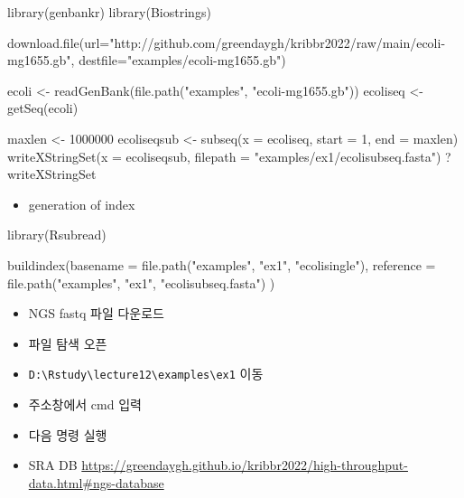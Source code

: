 \documentclass[
]{book}
\newenvironment{Shaded}{\begin{snugshade}}{\end{snugshade}}
\newcommand{\AttributeTok}[1]{\textcolor[rgb]{0.77,0.63,0.00}{#1}}
\newcommand{\DecValTok}[1]{\textcolor[rgb]{0.00,0.00,0.81}{#1}}
\newcommand{\FunctionTok}[1]{\textcolor[rgb]{0.00,0.00,0.00}{#1}}
\newcommand{\NormalTok}[1]{#1}
\newcommand{\OtherTok}[1]{\textcolor[rgb]{0.56,0.35,0.01}{#1}}
\newcommand{\StringTok}[1]{\textcolor[rgb]{0.31,0.60,0.02}{#1}}
\providecommand{\tightlist}{%
  \setlength{\itemsep}{0pt}\setlength{\parskip}{0pt}}
\begin{document}
\begin{Shaded}
\begin{Highlighting}[]
\FunctionTok{library}\NormalTok{(genbankr)}
\FunctionTok{library}\NormalTok{(Biostrings)}

\FunctionTok{download.file}\NormalTok{(}\AttributeTok{url=}\StringTok{"http://github.com/greendaygh/kribbr2022/raw/main/ecoli{-}mg1655.gb"}\NormalTok{, }\AttributeTok{destfile=}\StringTok{"examples/ecoli{-}mg1655.gb"}\NormalTok{)}

\NormalTok{ecoli }\OtherTok{\textless{}{-}} \FunctionTok{readGenBank}\NormalTok{(}\FunctionTok{file.path}\NormalTok{(}\StringTok{"examples"}\NormalTok{, }\StringTok{"ecoli{-}mg1655.gb"}\NormalTok{))}
\NormalTok{ecoliseq }\OtherTok{\textless{}{-}} \FunctionTok{getSeq}\NormalTok{(ecoli)}

\NormalTok{maxlen }\OtherTok{\textless{}{-}} \DecValTok{1000000}
\NormalTok{ecoliseqsub }\OtherTok{\textless{}{-}} \FunctionTok{subseq}\NormalTok{(}\AttributeTok{x =}\NormalTok{ ecoliseq, }\AttributeTok{start =} \DecValTok{1}\NormalTok{, }\AttributeTok{end =}\NormalTok{ maxlen)}
\FunctionTok{writeXStringSet}\NormalTok{(}\AttributeTok{x =}\NormalTok{ ecoliseqsub,}
                \AttributeTok{filepath =} \StringTok{"examples/ex1/ecolisubseq.fasta"}\NormalTok{)}
\NormalTok{?writeXStringSet}
\end{Highlighting}
\end{Shaded}

\begin{itemize}
\tightlist
\item
  generation of index
\end{itemize}

\begin{Shaded}
\begin{Highlighting}[]
\FunctionTok{library}\NormalTok{(Rsubread)}

\FunctionTok{buildindex}\NormalTok{(}\AttributeTok{basename =} \FunctionTok{file.path}\NormalTok{(}\StringTok{"examples"}\NormalTok{, }\StringTok{"ex1"}\NormalTok{, }\StringTok{"ecolisingle"}\NormalTok{),}
           \AttributeTok{reference =} \FunctionTok{file.path}\NormalTok{(}\StringTok{"examples"}\NormalTok{, }\StringTok{"ex1"}\NormalTok{, }\StringTok{"ecolisubseq.fasta"}\NormalTok{)}
\NormalTok{           )}
\end{Highlighting}
\end{Shaded}

\begin{itemize}
\tightlist
\item
  NGS fastq 파일 다운로드
\item
  파일 탐색 오픈
\item
  \texttt{D:\textbackslash{}Rstudy\textbackslash{}lecture12\textbackslash{}examples\textbackslash{}ex1} 이동
\item
  주소창에서 cmd 입력
\item
  다음 명령 실행
\item
  SRA DB \url{https://greendaygh.github.io/kribbr2022/high-throughput-data.html\#ngs-database}
\end{itemize}
\end{document}
